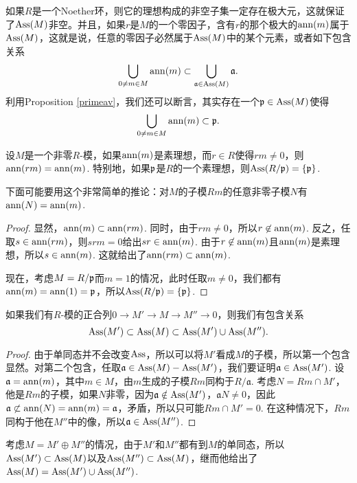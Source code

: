 如果$R$是一个Noether环，则它的理想构成的非空子集一定存在极大元，这就保证了$\operatorname{Ass}(M)$非空。并且，如果$r$是$M$的一个零因子，含有$r$的那个极大的$\operatorname{ann}(m)$属于$\operatorname{Ass}(M)$，这就是说，任意的零因子必然属于$\operatorname{Ass}(M)$中的某个元素，或者如下包含关系
\[
	\bigcup_{0\neq m\in M}\operatorname{ann}(m)\subset \bigcup_{\mathfrak{a}\in \operatorname{Ass}(M)}\mathfrak{a}. 
\]
利用Proposition \ref{primeav}，我们还可以断言，其实存在一个$\mathfrak{p}\in \operatorname{Ass}(M)$使得
\[
	\bigcup_{0\neq m\in M}\operatorname{ann}(m)\subset \mathfrak{p}.
\]

\begin{lem}
设$M$是一个非零$R$-模，如果$\operatorname{ann}(m)$是素理想，而$r\in R$使得$rm\neq 0$，则$\operatorname{ann}(rm)=\operatorname{ann}(m)$. 特别地，如果$\mathfrak{p}$是$R$的一个素理想，则$\operatorname{Ass}(R/\mathfrak{p})=\{\mathfrak{p}\}$.
\end{lem}

下面可能要用这个非常简单的推论：对$M$的子模$Rm$的任意非零子模$N$有$\operatorname{ann}(N)=\operatorname{ann}(m)$.

\begin{proof}
	显然，$\operatorname{ann}(m)\subset \operatorname{ann}(rm)$. 同时，由于$rm\neq 0$，所以$r\not\in \operatorname{ann}(m)$. 反之，任取$s\in \operatorname{ann}(rm)$，则$srm=0$给出$sr\in \operatorname{ann}(m)$. 由于$r\not\in \operatorname{ann}(m)$且$\operatorname{ann}(m)$是素理想，所以$s\in \operatorname{ann}(m)$. 这就给出了$\operatorname{ann}(rm)\subset \operatorname{ann}(m)$.

	现在，考虑$M=R/\mathfrak{p}$而$m=1$的情况，此时任取$m\neq 0$，我们都有$\operatorname{ann}(m)=\operatorname{ann}(1)=\mathfrak{p}$，所以$\operatorname{Ass}(R/\mathfrak{p})=\{\mathfrak{p}\}$.
\end{proof}

\begin{pro}
如果我们有$R$-模的正合列$0\to M'\to M\to M''\to 0$，则我们有包含关系
\[
	\operatorname{Ass}(M')\subset \operatorname{Ass}(M)\subset \operatorname{Ass}(M')\cup \operatorname{Ass}(M'').
\]
\end{pro}

\begin{proof}
	由于单同态并不会改变$\operatorname{Ass}$，所以可以将$M'$看成$M$的子模，所以第一个包含显然。对第二个包含，任取$\mathfrak{a}\in \operatorname{Ass}(M)-\operatorname{Ass}(M')$，我们要证明$\mathfrak{a}\in \operatorname{Ass}(M')$. 设$\mathfrak{a}=\operatorname{ann}(m)$，其中$m\in M$，由$m$生成的子模$Rm$同构于$R/\mathfrak{a}$. 考虑$N=Rm\cap M'$，他是$Rm$的子模，如果$N$非零，因为$\mathfrak{a}\notin \operatorname{Ass}(M')$，$\mathfrak{a}N\neq 0$，因此$\mathfrak{a}\not\subset \operatorname{ann}(N)=\operatorname{ann}(m)=\mathfrak{a}$，矛盾，所以只可能$Rm\cap M'=0$. 在这种情况下，$Rm$同构于他在$M''$中的像，所以$\mathfrak{a}\in \operatorname{Ass}(M'')$.
\end{proof}

考虑$M=M'\oplus M''$的情况，由于$M'$和$M''$都有到$M$的单同态，所以$\operatorname{Ass}(M')\subset \operatorname{Ass}(M)$以及$\operatorname{Ass}(M'')\subset \operatorname{Ass}(M)$，继而他给出了$\operatorname{Ass}(M)=\operatorname{Ass}(M')\cup \operatorname{Ass}(M'')$.

